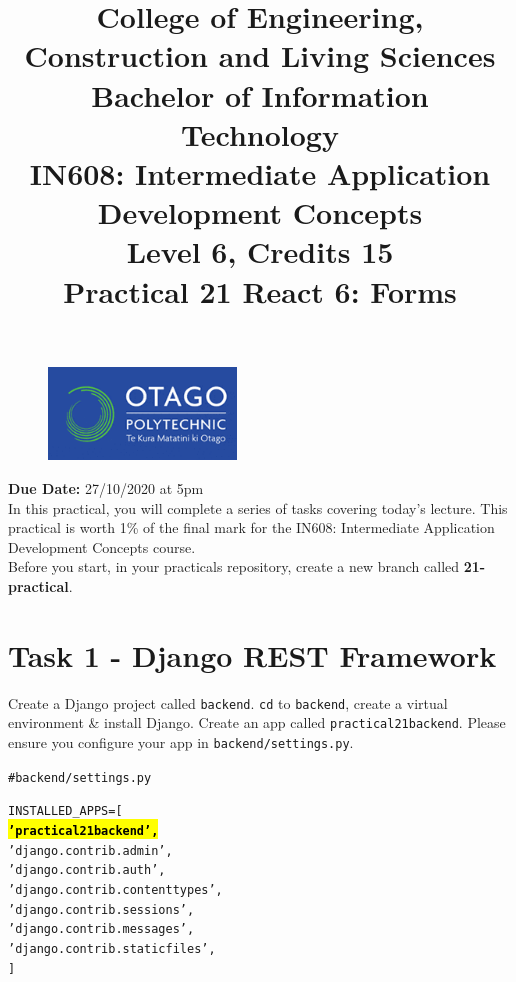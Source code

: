 \documentclass{article}
\author{}
\begin{document}
\begin{figure}
	\centering
	\includegraphics[width=50mm]{img/logo.png}
\end{figure}

\title{College of Engineering, Construction and Living Sciences\\Bachelor of Information Technology\\IN608: Intermediate Application Development Concepts\\Level 6, Credits 15\\\textbf{Practical 21 React 6: Forms}} 
\date{}
\maketitle

\textbf{Due Date:} 27/10/2020 at 5pm \\

In this practical, you will complete a series of tasks covering today's lecture. This practical is worth 1\% of the final mark for the IN608: Intermediate Application Development Concepts course. \\

Before you start, in your practicals repository, create a new branch called \textbf{21-practical}. \\

\section*{Task 1 - Django REST Framework} 
Create a Django project called \texttt{backend}. \texttt{cd} to \texttt{backend}, create a virtual environment \& install Django. Create an app called \texttt{practical21backend}. Please ensure you configure your app in \texttt{backend/settings.py}.

\begin{alltt}
  # backend/settings.py

  INSTALLED_APPS = [
      \hl{\textbf{'practical21backend',}} 
      'django.contrib.admin',
      'django.contrib.auth',
      'django.contrib.contenttypes',
      'django.contrib.sessions',
      'django.contrib.messages',
      'django.contrib.staticfiles',
  ]
\end{alltt}
\end{document}
